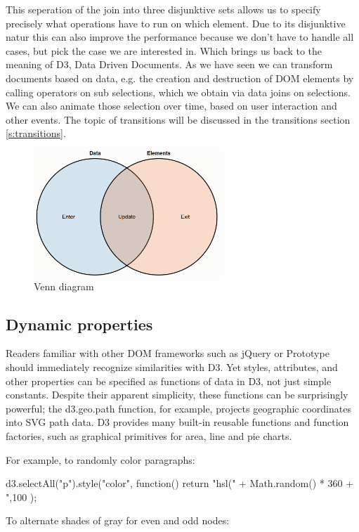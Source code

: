 \documentclass{bioinfo}
\begin{document}
This seperation of the join into three disjunktive sets allows us to specify precisely what operations have to run on which element. Due to its disjunktive natur this can also improve the performance because we don't have to handle all cases, but pick the case we are interested in.
Which brings us back to the meaning of D3, Data Driven Documents.
As we have seen we can transform documents based on data, e.g. the creation and destruction of DOM elements by calling operators on sub selections, which we obtain via data joins on selections.
We can also animate those selection over time, based on user interaction and other events.
The topic of transitions will be discussed in the transitions section \ref{s:transitions}.

\begin{figure}[!tpb]
\centerline{\includegraphics[width=70mm]{vennDiagram.PNG}} %
\caption{Venn diagram}\label{fig:venn}
\end{figure}


\subsection{Dynamic properties}
Readers familiar with other DOM frameworks such as jQuery or Prototype should immediately recognize similarities with D3. Yet styles, attributes, and other properties can be specified as functions of data in D3, not just simple constants. Despite their apparent simplicity, these functions can be surprisingly powerful; the d3.geo.path function, for example, projects geographic coordinates into SVG path data. D3 provides many built-in reusable functions and function factories, such as graphical primitives for area, line and pie charts.

For example, to randomly color paragraphs:

d3.selectAll("p").style("color", function() {
  return "hsl(" + Math.random() * 360 + ",100%
});

To alternate shades of gray for even and odd nodes:
\end{document}
